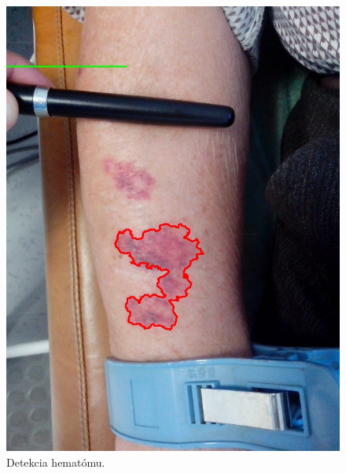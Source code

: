 \begin{figure}[h]
   \begin{minipage}{0.4\textwidth}
     \centering
     \includegraphics[scale=0.35]{fig/2o.jpeg}
      \caption{Detekcia hematómu.}
      \label{fig:w2}
   \end{minipage}\hfill
   \begin{minipage}{0.4\textwidth}
     \centering

\end{minipage}
\end{figure}
